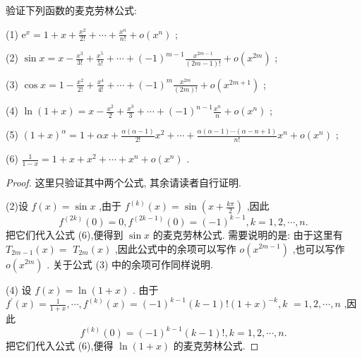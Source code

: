 \begin{example}
验证下列函数的麦克劳林公式:

(1) \({\mathrm{e}}^{x} = 1 + x + \frac{{x}^{2}}{2!} + \cdots  + \frac{{x}^{n}}{n!} + o\left( {x}^{n}\right)\) ;

(2) \(\sin x = x - \frac{{x}^{3}}{3!} + \frac{{x}^{5}}{5!} + \cdots  + {\left( -1\right) }^{m - 1}\frac{{x}^{{2m} - 1}}{\left( {{2m} - 1}\right) !} + o\left( {x}^{2m}\right)\) ;

(3) \(\cos x = 1 - \frac{{x}^{2}}{2!} + \frac{{x}^{4}}{4!} + \cdots  + {\left( -1\right) }^{m}\frac{{x}^{2m}}{\left( {2m}\right) !} + o\left( {x}^{{2m} + 1}\right)\) ;

(4) \(\ln \left( {1 + x}\right)  = x - \frac{{x}^{2}}{2} + \frac{{x}^{3}}{3} + \cdots  + {\left( -1\right) }^{n - 1}\frac{{x}^{n}}{n} + o\left( {x}^{n}\right)\) ;

(5) \({\left( 1 + x\right) }^{\alpha } = 1 + {\alpha x} + \frac{\alpha \left( {\alpha  - 1}\right) }{2!}{x}^{2} + \cdots  + \frac{\alpha \left( {\alpha  - 1}\right) \cdots \left( {\alpha  - n + 1}\right) }{n!}{x}^{n} + o\left( {x}^{n}\right)\) ;

(6) \(\frac{1}{1 - x} = 1 + x + {x}^{2} + \cdots  + {x}^{n} + o\left( {x}^{n}\right)\) .
\end{example}

\begin{proof}
这里只验证其中两个公式, 其余请读者自行证明.

(2)设 \(f\left( x\right)  = \sin x\) ,由于 \({f}^{\left( k\right) }\left( x\right)  = \sin \left( {x + \frac{k\pi }{2}}\right)\) ,因此
\[
{f}^{\left( 2k\right) }\left( 0\right)  = 0,{f}^{\left( 2k - 1\right) }\left( 0\right)  = {\left( -1\right) }^{k - 1},k = 1,2,\cdots ,n.
\]
把它们代入公式 (6),便得到 \(\sin x\) 的麦克劳林公式. 需要说明的是: 由于这里有 \({T}_{{2m} - 1}\left( x\right)  =\)  \({T}_{2m}\left( x\right)\) ,因此公式中的余项可以写作 \(o\left( {x}^{{2m} - 1}\right)\) ,也可以写作 \(o\left( {x}^{2m}\right)\) . 关于公式 (3) 中的余项可作同样说明.

(4) 设 \(f\left( x\right)  = \ln \left( {1 + x}\right)\) . 由于 \({f}^{\prime }\left( x\right)  = \frac{1}{1 + x},\cdots ,{f}^{\left( k\right) }\left( x\right)  = {\left( -1\right) }^{k - 1}\left( {k - 1}\right) !{\left( 1 + x\right) }^{-k},k\)  \(= 1,2,\cdots ,n\) ,因此
\[
{f}^{\left( k\right) }\left( 0\right)  = {\left( -1\right) }^{k - 1}\left( {k - 1}\right) !,k = 1,2,\cdots ,n.
\]
把它们代入公式 (6),便得 \(\ln \left( {1 + x}\right)\) 的麦克劳林公式.
\end{proof}


